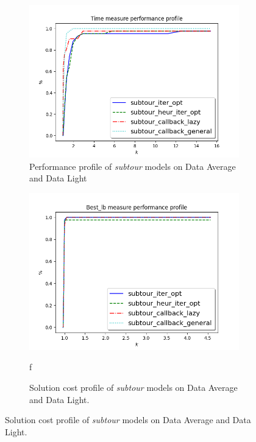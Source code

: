 \begin{figure}[h]
	\begin{subfigure}{.5\textwidth}
		\centering
		\includegraphics[width=\columnwidth]{../res/Lsubtours_lightaverage_time.png}
		\caption{Performance profile of \textit{subtour} models on Data Average and Data Light}
		\label{fig:res_subtour_av}
	\end{subfigure}
	\begin{subfigure}{.5\textwidth}
	\centering
	\includegraphics[width=\columnwidth]{../res/Lsubtours_lightaverage_lb.png}
	\caption{Solution cost profile of \textit{subtour} models on Data Average and Data Light.}
	\label{fig:res_subtour_li}f
	\end{subfigure}
\end{figure}


